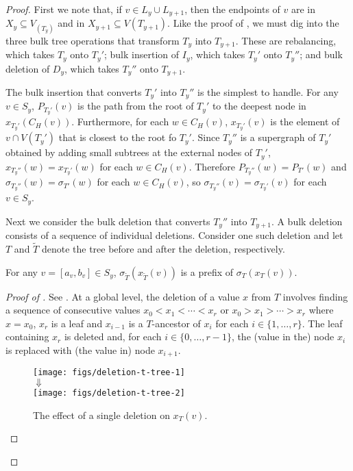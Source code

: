 \documentclass[kpfonts]{patmorin}
\begin{document}
\begin{proof}
  First we note that, if $v\in L_y\cup L_{y+1}$, then the endpoints of $v$ are in $X_y\subseteq V_(T_y)$ and in $X_{y+1}\subseteq V(T_{y+1})$.
  Like the proof of , we must dig into the three bulk tree operations that transform $T_y$ into $T_{y+1}$. These are rebalancing, which takes $T_y$ onto $T_y'$; bulk insertion of $I_y$, which takes $T_y'$ onto $T_y''$; and bulk deletion of $D_y$, which takes $T_y''$ onto $T_{y+1}$.
  
  The bulk insertion that converts $T_y'$ into $T_y''$ is the simplest to handle.  For any $v\in S_y$, $P_{T_y'}(v)$ is the path from the root of $T_y'$ to the deepest node in $x_{T_y'}(C_H(v))$.  Furthermore, for each $w\in C_H(v)$, $x_{T_y'}(v)$ is the element of $v\cap V(T_y')$ that is closest to the root fo $T_y'$. Since $T_y''$ is a supergraph of $T_y'$ obtained by adding small subtrees at the external nodes of $T_y'$, $x_{T_y''}(w)=x_{T_y'}(w)$ for each $w\in C_H(v)$.  Therefore $P_{T_y''}(w)=P_{T'}(w)$ and $\sigma_{T_y''}(w)=\sigma_{T'}(w)$ for each $w\in C_H(v)$, so $\sigma_{T_y''}(v)=\sigma_{T_y'}(v)$ for each $v\in S_y$.
  
  Next we consider the bulk deletion that converts $T_y''$ into $T_{y+1}$.  A bulk deletion consists of a sequence of individual deletions. Consider one such deletion and let $T$ and $\tilde{T}$ denote the tree before and after the deletion, respectively.  
  
  \begin{clm}
    For any $v=[a_v,b_v]\in S_y$, $\sigma_{\tilde{T}}(x_{\tilde{T}}(v))$ is a prefix of $\sigma_T(x_T(v))$.   
  \end{clm}
  
  \begin{proof}[Proof of ]  
    See .  At a global level, the deletion of a value $x$ from $T$ involves finding a sequence of consecutive values $x_0<x_1<\cdots<x_r$ or $x_0>x_1>\cdots>x_r$ where $x=x_0$, $x_r$ is a leaf and $x_{i-1}$ is a $T$-ancestor of $x_{i}$ for each $i\in\{1,\ldots,r\}$.  The leaf containing $x_r$ is deleted and, for each $i\in\{0,\ldots,r-1\}$, the (value in the) node $x_i$ is replaced with (the value in) node $x_{i+1}$.  

    \begin{figure}
      \begin{center}
        \texttt{[image: figs/deletion-t-tree-1]}\\[1ex]
        $\Downarrow$\\[1ex]   
        \texttt{[image: figs/deletion-t-tree-2]}   
      \end{center}
      \caption{The effect of a single deletion on $x_T(v)$.}
    \end{figure}
    

\end{proof}
\end{proof}
\end{document}
